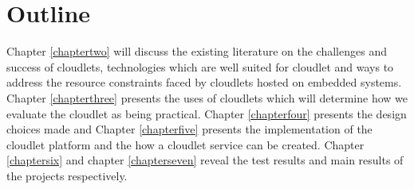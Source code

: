 \section{Outline}
Chapter \ref{chaptertwo} will discuss the existing literature on the challenges and success of cloudlets, technologies which are well suited for cloudlet and ways to address the resource constraints faced by cloudlets hosted on embedded systems. Chapter \ref{chapterthree} presents the uses of cloudlets which will determine how we evaluate the cloudlet as being practical. Chapter \ref{chapterfour} presents the design choices made and Chapter \ref{chapterfive} presents the implementation of the cloudlet platform and the how a cloudlet service can be created. Chapter \ref{chaptersix} and chapter \ref{chapterseven} reveal the test results and main results of the projects respectively.